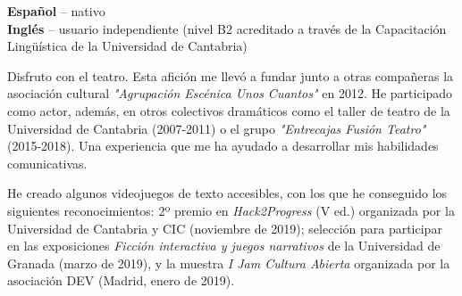 \documentclass[9pt]{developercv} %
\begin{document}
\begin{minipage}[t]{0.3\textwidth}
	\vspace{-\baselineskip} %

	
	\textbf{Español} -- nativo\\
	\textbf{Inglés} -- usuario independiente (nivel B2 acreditado a través de la Capacitación Lingüística de la Universidad de Cantabria)\\
\end{minipage}
\hfill
\begin{minipage}[t]{0.3\textwidth}
	\vspace{-\baselineskip} %
	

	Disfruto con el teatro. Esta afición me llevó a fundar junto a otras compañeras la asociación cultural \emph{"Agrupación Escénica Unos Cuantos"} en 2012. He participado como actor, además, en otros colectivos dramáticos como el taller de teatro de la Universidad de Cantabria (2007-2011) o el grupo \emph{"Entrecajas Fusión Teatro"} (2015-2018). Una experiencia que me ha ayudado a desarrollar mis habilidades comunicativas.
\end{minipage}
\hfill
\begin{minipage}[t]{0.3\textwidth}
	\vspace{-\baselineskip} %
	

	He creado algunos videojuegos de texto accesibles, con los que he conseguido los siguientes reconocimientos: 2º premio en \emph{Hack2Progress} (V ed.) organizada por la Universidad de Cantabria y CIC (noviembre de 2019); selección para participar en las exposiciones \emph{Ficción interactiva y juegos narrativos} de la Universidad de Granada (marzo de 2019), y la muestra \emph{I Jam Cultura Abierta} organizada por la asociación DEV (Madrid, enero de 2019).
\end{minipage}

\end{document}
